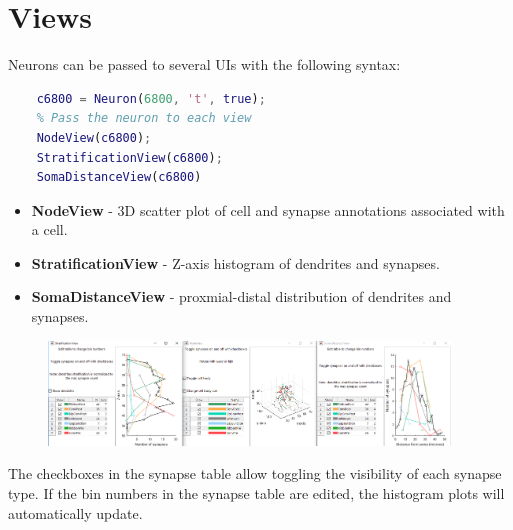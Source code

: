 \documentclass[12pt]{exam}
\begin{document}
	\section{Views}
	Neurons can be passed to several UIs with the following syntax:
	\begin{lstlisting}[language=matlab]
	% Import a neuron with synapses
	c6800 = Neuron(6800, 't', true);
	% Pass the neuron to each view
	NodeView(c6800);
	StratificationView(c6800);
	SomaDistanceView(c6800)\end{lstlisting}
	\begin{itemize}
		\item \textbf{NodeView} - 3D scatter plot of cell and synapse annotations associated with a cell.
		\item \textbf{StratificationView} - Z-axis histogram of dendrites and synapses.
		\item \textbf{SomaDistanceView} - proxmial-distal distribution of dendrites and synapses.
	\end{itemize}
	\begin{center}
		\begin{figure}[h]
		\includegraphics[width=0.95\textwidth]{views}
		\end{figure}
	\end{center}
	The checkboxes in the synapse table allow toggling the visibility of each synapse type. If the bin numbers in the synapse table are edited, the histogram plots will automatically update.
\end{document}
